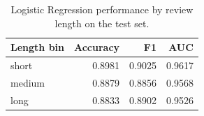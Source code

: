 \begin{table}
\caption{Logistic Regression performance by review length on the test set.}
\label{tab:logreg_length_performance}
\begin{tabular}{lrrr}
\toprule
Length bin & Accuracy & F1 & AUC \\
\midrule
short & 0.8981 & 0.9025 & 0.9617 \\
medium & 0.8879 & 0.8856 & 0.9568 \\
long & 0.8833 & 0.8902 & 0.9526 \\
\bottomrule
\end{tabular}
\end{table}
